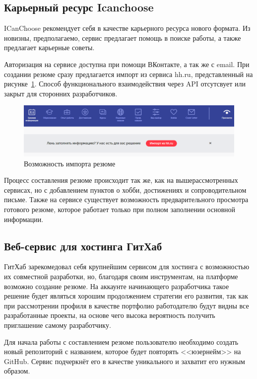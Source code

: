 \documentclass[master, och, diploma]{SCWorks}
\begin{document}
\subsection{Карьерный ресурс Icanchoose}
ICanChoose рекомендует себя в качестве карьерного ресурса нового формата. Из новизны, предполагаемо, сервис предлагает помощь в поиске работы, а также предлагает карьерные советы.

Авторизация на сервисе доступна при помощи ВКонтакте, а так же с email. При создании резюме сразу предлагается импорт из сервиса hh.ru, представленный на рисунке~\ref{fig:12}. Способ функционального взаимодействия через API отсутсвует или закрыт для сторонних разработчиков.
\begin{figure}[!ht]
    \centering
    \includegraphics[width=12cm]{images/image13.png}
    \caption{\label{fig:12}%
        Возможность импорта резюме}
\end{figure}

Процесс составления резюме происходит так же, как на вышерассмотренных сервисах, но с добавлением пунктов о хобби, достижениях и сопроводительном письме. Также на сервисе существует возможность предварительного просмотра готового резюме, которое работает только при полном заполнении основной информации.



\subsection{Веб-сервис для хостинга ГитХаб}
ГитХаб зарекомедовал себя крупнейшим сервисом для хостинга с возможностью их совместной разработки, но, благодаря своим инструментам, на платформе возможно создание резюме. На аккаунте начинающего разработчика такое решение будет являться хорошим продолжением стратегии его развития, так как при рассмотрении профиля в качестве портфолио работодателю будут видны все разработанные проекты, на основе чего высока вероятность получить приглашение самому разработчику.

Для начала работы с составлением резюме пользователю необходимо создать новый репозиторий с названием, которое будет повторять <<юзернейм>> на GitHub. Сервис подчеркнёт его в качестве уникального и захватит его нужным образом.
\end{document}
